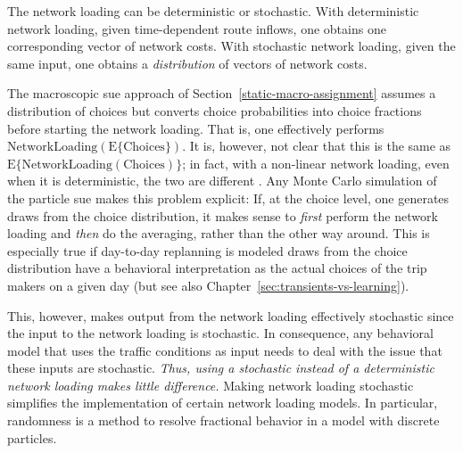 The network loading can be deterministic or stochastic.  
%
With deterministic network loading, given time-dependent route inflows,
one obtains one corresponding vector of network costs.
%
%
With stochastic network loading, given the same input, one obtains a
\emph{distribution} of vectors of network costs.

The macroscopic \gls{sue} approach of Section~\ref{static-macro-assignment}
assumes a distribution of choices\corr{,}{} but
converts choice probabilities into choice fractions before starting
the network loading.  That is, one effectively performs 
$\text{NetworkLoading}( \text{E}\{ \text{Choices} \})$.  
It is, however, not clear that this is the same as 
$\text{E}\{ \text{NetworkLoading}( \text{Choices} ) \}$; 
in fact, with a non-linear network loading, even when it is deterministic,
the two are different \citep{cascetta-1989}. Any Monte Carlo simulation of
the particle \gls{sue} makes this problem explicit: If, at the choice level,
one generates draws from the choice distribution, it makes
sense to \emph{first} perform the network loading and \emph{then} do
the averaging, rather than the other way around.
This is especially true if day-to-day replanning is modeled draws from the choice distribution have a
behavioral interpretation as the actual choices of the trip makers
on a given day (but see also Chapter~\ref{sec:transients-vs-learning}).

This, however, makes  output from the network loading effectively
stochastic\corr{,}{} since the input to the network loading is stochastic.  In
consequence, any behavioral model that uses the traffic conditions as
input needs to deal with the issue that these inputs are stochastic.
\emph{Thus, using a stochastic\corr{,}{} instead of a deterministic\corr{,}{}
network loading makes little difference.}  
Making  network loading stochastic simplifies the implementation of
certain network loading models.  
In particular, randomness is a method to
resolve fractional behavior in a model with discrete particles.

